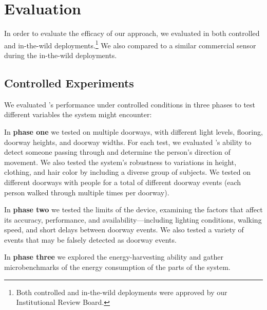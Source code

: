 \section{Evaluation}
\label{sec:evaluation}
In order to evaluate the efficacy of our approach, we evaluated \sysname in both controlled and in-the-wild deployments.\footnote{Both controlled and in-the-wild deployments were approved by our Institutional Review Board.}
We also compared \sysname to a similar commercial sensor during the in-the-wild deployments.   

\subsection{Controlled Experiments} 
We evaluated \sysname's performance under controlled conditions in three phases to test different variables the system might encounter:

In \textbf{phase one} we tested \sysname on multiple doorways, with different light levels, flooring, doorway heights, and doorway widths.
For each test, we evaluated \sysname's ability to detect someone passing through and determine the person's direction of movement.
We also tested the system's robustness to variations in height, clothing, and hair color by including a diverse group of subjects.
We tested on \numDoors different doorways with \numPeople people for a total of \numExp different doorway events (each person walked through multiple times per doorway).

In \textbf{phase two} we tested the limits of the device, examining the factors that affect its accuracy, performance, and availability---including lighting conditions, walking speed, and short delays between doorway events.
We also tested a variety of events that may be falsely detected as doorway events.

In \textbf{phase three} we explored the energy-harvesting ability and gather microbenchmarks of the energy consumption of the parts of the \sysname system.

